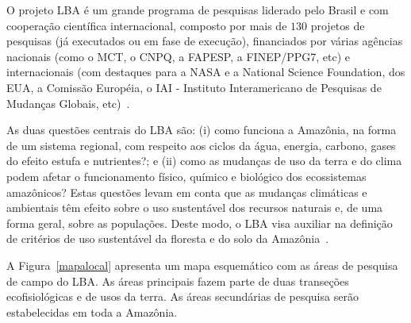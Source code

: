 O projeto LBA é um grande programa de pesquisas liderado pelo Brasil e com cooperação científica internacional, composto por mais de $130$ projetos de pesquisas (já executados ou em fase de execução), financiados por várias agências nacionais (como o MCT, o CNPQ, a FAPESP, a FINEP/PPG7, etc) e internacionais (com destaques para a NASA e a National Science Foundation, dos EUA, a Comissão Européia, o IAI - Instituto Interamericano de Pesquisas de Mudanças Globais, etc)~\cite{nobre/2005}. 

As duas questões centrais do LBA são: (i) como funciona a Amazônia, na forma de um sistema regional, com respeito aos ciclos da água, energia, carbono, gases do efeito estufa e nutrientes?; e (ii) como as mudanças de uso da terra e do clima podem afetar o funcionamento físico, químico e biológico dos ecossistemas amazônicos? Estas questões levam em conta que as mudanças climáticas e ambientais têm efeito sobre o uso sustentável dos recursos naturais e, de uma forma geral, sobre as populações. Deste modo, o LBA visa auxiliar na definição de critérios de uso sustentável da floresta e do solo da Amazônia~\cite{nobre/2005}. 

A Figura~\ref{mapalocal} apresenta um mapa esquemático com as áreas de pesquisa de campo do LBA. As áreas principais fazem parte de duas transeções ecofisiológicas e de usos da terra. As áreas secundárias de pesquisa serão estabelecidas em toda a Amazônia.

